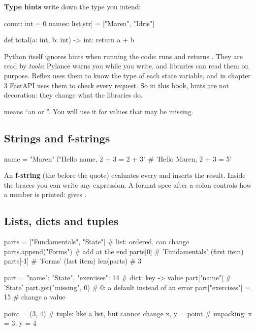 \textbf{Type hints} write down the type you intend:

\begin{py}
count: int = 0
names: list[str] = ["Maren", "Idris"]

def total(a: int, b: int) -> int:
	return a + b
\end{py}

Python itself ignores hints when running the code:  runs and returns . They are read by \emph{tools}: Pylance warns you while you write, and libraries can read them on purpose. Reflex uses them to know the type of each state variable, and in chapter 3 FastAPI uses them to check every request. So in this book, hints are not decoration: they change what the libraries do.

 means ``an  or ''. You will use it for values that may be missing.

\subsection{Strings and f-strings}

\begin{py}
name = "Maren"
f"Hello {name}, 2 + 3 = {2 + 3}"     # 'Hello Maren, 2 + 3 = 5'
\end{py}

An \textbf{f-string} (the  before the quote) evaluates every  and inserts the result. Inside the braces you can write any expression. A format spec after a colon controls how a number is printed:  gives .

\subsection{Lists, dicts and tuples}

\begin{py}
parts = ["Fundamentals", "State"]          # list: ordered, can change
parts.append("Forms")                      # add at the end
parts[0]                                   # 'Fundamentals' (first item)
parts[-1]                                  # 'Forms' (last item)
len(parts)                                 # 3

part = {"name": "State", "exercises": 14}  # dict: key -> value
part["name"]                               # 'State'
part.get("missing", 0)                     # 0: a default instead of an error
part["exercises"] = 15                     # change a value

point = (3, 4)                             # tuple: like a list, but cannot change
x, y = point                               # unpacking: x = 3, y = 4
\end{py}

